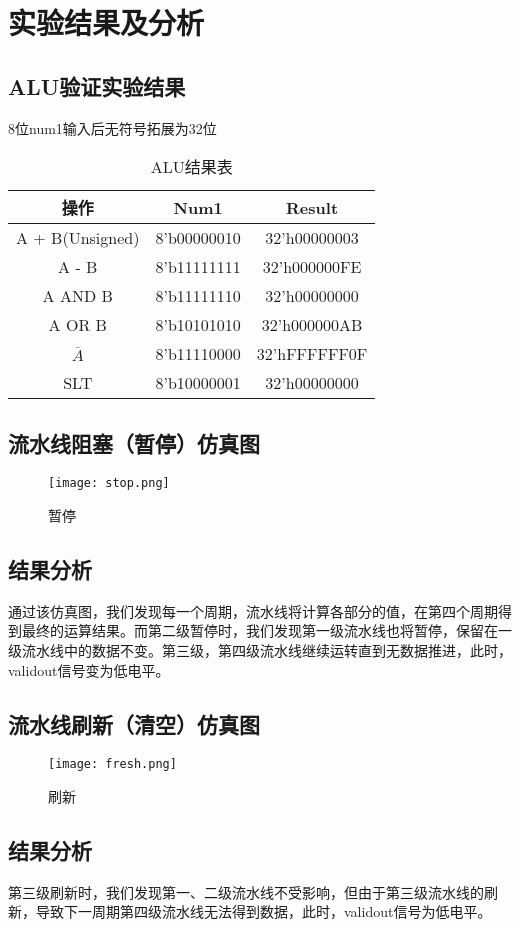 \newpage
\section{实验结果及分析}
\subsection{ALU验证实验结果}
8位num1输入后无符号拓展为32位
\begin{table}[htbp]
    \centering
    \caption{ALU结果表}
    \begin{tabular}{c|c|c}
        \hline
        操作            &	Num1        &	Result\\
        \hline
        A + B(Unsigned) &	8’b00000010 & 	32'h00000003\\
        A - B           &	8’b11111111 &	32'h000000FE\\
        A AND B         &	8’b11111110 &	32'h00000000\\
        A OR B          &	8’b10101010 &	32'h000000AB\\
        $\overline{A}$  &	8’b11110000 &	32'hFFFFFF0F\\
        SLT             &	8’b10000001 &	32'h00000000\\
        \hline
    \end{tabular}
    \label{tab:my1}
\end{table}

\subsection{流水线阻塞（暂停）仿真图}
\begin{figure}[htbp]
    \centering
    \texttt{[image: stop.png]}
    \caption{暂停}
    \label{fig:2}
\end{figure}

\subsection{结果分析}
通过该仿真图，我们发现每一个周期，流水线将计算各部分的值，在第四个周期得到最终的运算结果。而第二级暂停时，我们发现第一级流水线也将暂停，保留在一级流水线中的数据不变。第三级，第四级流水线继续运转直到无数据推进，此时，validout信号变为低电平。

\subsection{流水线刷新（清空）仿真图}
\begin{figure}[htbp]
    \centering
    \texttt{[image: fresh.png]}
    \caption{刷新}
    \label{fig:3}
\end{figure}

\subsection{结果分析}
第三级刷新时，我们发现第一、二级流水线不受影响，但由于第三级流水线的刷新，导致下一周期第四级流水线无法得到数据，此时，validout信号为低电平。